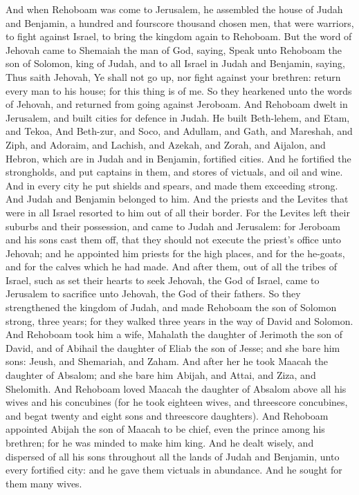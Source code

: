 And when Rehoboam was come to Jerusalem, he assembled the house of Judah and Benjamin, a hundred and fourscore thousand chosen men, that were warriors, to fight against Israel, to bring the kingdom again to Rehoboam. But the word of Jehovah came to Shemaiah the man of God, saying, Speak unto Rehoboam the son of Solomon, king of Judah, and to all Israel in Judah and Benjamin, saying, Thus saith Jehovah, Ye shall not go up, nor fight against your brethren: return every man to his house; for this thing is of me. So they hearkened unto the words of Jehovah, and returned from going against Jeroboam.  And Rehoboam dwelt in Jerusalem, and built cities for defence in Judah. He built Beth-lehem, and Etam, and Tekoa, And Beth-zur, and Soco, and Adullam, and Gath, and Mareshah, and Ziph, and Adoraim, and Lachish, and Azekah, and Zorah, and Aijalon, and Hebron, which are in Judah and in Benjamin, fortified cities. And he fortified the strongholds, and put captains in them, and stores of victuals, and oil and wine. And in every city he put shields and spears, and made them exceeding strong. And Judah and Benjamin belonged to him.  And the priests and the Levites that were in all Israel resorted to him out of all their border. For the Levites left their suburbs and their possession, and came to Judah and Jerusalem: for Jeroboam and his sons cast them off, that they should not execute the priest’s office unto Jehovah; and he appointed him priests for the high places, and for the he-goats, and for the calves which he had made. And after them, out of all the tribes of Israel, such as set their hearts to seek Jehovah, the God of Israel, came to Jerusalem to sacrifice unto Jehovah, the God of their fathers. So they strengthened the kingdom of Judah, and made Rehoboam the son of Solomon strong, three years; for they walked three years in the way of David and Solomon.  And Rehoboam took him a wife, Mahalath the daughter of Jerimoth the son of David, and of Abihail the daughter of Eliab the son of Jesse; and she bare him sons: Jeush, and Shemariah, and Zaham. And after her he took Maacah the daughter of Absalom; and she bare him Abijah, and Attai, and Ziza, and Shelomith. And Rehoboam loved Maacah the daughter of Absalom above all his wives and his concubines (for he took eighteen wives, and threescore concubines, and begat twenty and eight sons and threescore daughters). And Rehoboam appointed Abijah the son of Maacah to be chief, even the prince among his brethren; for he was minded to make him king. And he dealt wisely, and dispersed of all his sons throughout all the lands of Judah and Benjamin, unto every fortified city: and he gave them victuals in abundance. And he sought for them many wives. 

